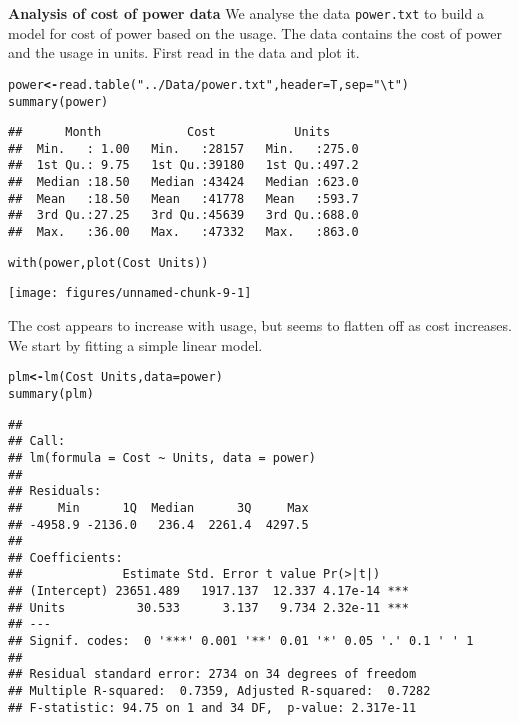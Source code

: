 \documentclass[11pt]{article}\usepackage[]{graphicx}\usepackage[]{xcolor}
\makeatletter
\newcommand{\hlstr}[1]{\textcolor[rgb]{0.651,0.522,0}{#1}}%
\newcommand{\hlopt}[1]{\textcolor[rgb]{1,0,0.502}{\textbf{#1}}}%
\newcommand{\hlstd}[1]{\textcolor[rgb]{0,0,0}{#1}}%
\newcommand{\hlkwb}[1]{\textcolor[rgb]{0.502,0.502,0.753}{\textbf{#1}}}%
\newcommand{\hlkwc}[1]{\textcolor[rgb]{0,0.502,0.753}{#1}}%
\newcommand{\hlkwd}[1]{\textcolor[rgb]{0,0.267,0.4}{#1}}%
\newenvironment{kframe}{%
 \def\at@end@of@kframe{}%
 \ifinner\ifhmode%
  \def\at@end@of@kframe{\end{minipage}}%
  \begin{minipage}{\columnwidth}%
 \fi\fi%
 \def\FrameCommand##1{\hskip\@totalleftmargin \hskip-\fboxsep
 \colorbox{shadecolor}{##1}\hskip-\fboxsep
     \hskip-\linewidth \hskip-\@totalleftmargin \hskip\columnwidth}%
 \MakeFramed {\advance\hsize-\width
   \@totalleftmargin\z@ \linewidth\hsize
   \@setminipage}}%
 {\par\unskip\endMakeFramed%
 \at@end@of@kframe}
\newenvironment{knitrout}{}{} %
\newcommand{\phead}[1]{{\bf{\color{mycol}#1}}}
\renewenvironment{knitrout}{%
  \begin{small}%
  \setlength{\topsep}{3.0pt plus 1.0pt minus 1.0pt}%
  \setlength{\partopsep}{1.0pt plus 1.0pt minus 1.0pt}%
  \setlength{\parskip}{0pt}}{\end{small}}
\makeatother
\begin{document}
\phead{Analysis of cost of power data}
We analyse the data \texttt{power.txt} to build a model for cost of power based on the usage. The data contains the
cost of power and the usage in units. First read in the data and
plot it.
\begin{knitrout}
\color{fgcolor}\begin{kframe}
\begin{alltt}
\hlstd{power} \hlkwb{<-} \hlkwd{read.table}\hlstd{(}\hlstr{"../Data/power.txt"}\hlstd{,} \hlkwc{header} \hlstd{= T,} \hlkwc{sep} \hlstd{=} \hlstr{"\textbackslash{}t"}\hlstd{)}
\hlkwd{summary}\hlstd{(power)}
\end{alltt}
\begin{verbatim}
##      Month            Cost           Units      
##  Min.   : 1.00   Min.   :28157   Min.   :275.0  
##  1st Qu.: 9.75   1st Qu.:39180   1st Qu.:497.2  
##  Median :18.50   Median :43424   Median :623.0  
##  Mean   :18.50   Mean   :41778   Mean   :593.7  
##  3rd Qu.:27.25   3rd Qu.:45639   3rd Qu.:688.0  
##  Max.   :36.00   Max.   :47332   Max.   :863.0
\end{verbatim}
\begin{alltt}
\hlkwd{with}\hlstd{(power,} \hlkwd{plot}\hlstd{(Cost} \hlopt{~} \hlstd{Units))}
\end{alltt}
\end{kframe}

{\centering \texttt{[image: figures/unnamed-chunk-9-1]} 

}


\end{knitrout}
The cost appears to increase with usage, but seems to flatten off as cost increases. We start by fitting a simple linear
model.
\begin{knitrout}
\color{fgcolor}\begin{kframe}
\begin{alltt}
\hlstd{plm} \hlkwb{<-} \hlkwd{lm}\hlstd{(Cost} \hlopt{~} \hlstd{Units,} \hlkwc{data} \hlstd{= power)}
\hlkwd{summary}\hlstd{(plm)}
\end{alltt}
\begin{verbatim}
## 
## Call:
## lm(formula = Cost ~ Units, data = power)
## 
## Residuals:
##     Min      1Q  Median      3Q     Max 
## -4958.9 -2136.0   236.4  2261.4  4297.5 
## 
## Coefficients:
##              Estimate Std. Error t value Pr(>|t|)    
## (Intercept) 23651.489   1917.137  12.337 4.17e-14 ***
## Units          30.533      3.137   9.734 2.32e-11 ***
## ---
## Signif. codes:  0 '***' 0.001 '**' 0.01 '*' 0.05 '.' 0.1 ' ' 1
## 
## Residual standard error: 2734 on 34 degrees of freedom
## Multiple R-squared:  0.7359,	Adjusted R-squared:  0.7282 
## F-statistic: 94.75 on 1 and 34 DF,  p-value: 2.317e-11
\end{verbatim}
\end{kframe}
\end{knitrout}
\end{document}
